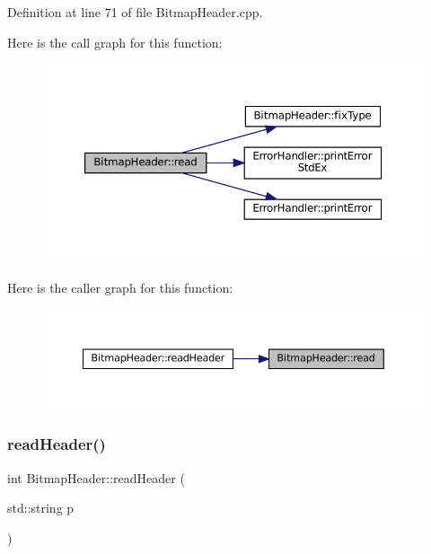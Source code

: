 Definition at line 71 of file Bitmap\+Header.\+cpp.

Here is the call graph for this function\+:\nopagebreak
\begin{figure}[H]
\begin{center}
\leavevmode
\includegraphics[width=350pt]{classBitmapHeader_aebc19bf8a908f1f7edfc5b10186c9db8_cgraph}
\end{center}
\end{figure}
Here is the caller graph for this function\+:\nopagebreak
\begin{figure}[H]
\begin{center}
\leavevmode
\includegraphics[width=350pt]{classBitmapHeader_aebc19bf8a908f1f7edfc5b10186c9db8_icgraph}
\end{center}
\end{figure}
\mbox{\label{classBitmapHeader_a2de360d5111136167f5885bed561bc8c}} 
\subsubsection{\texorpdfstring{readHeader()}{readHeader()}\hspace{0.1cm}{\footnotesize\ttfamily [1/2]}}
{\footnotesize\ttfamily int Bitmap\+Header\+::read\+Header (\begin{DoxyParamCaption}\item[{std\+::string}]{p }\end{DoxyParamCaption})}



